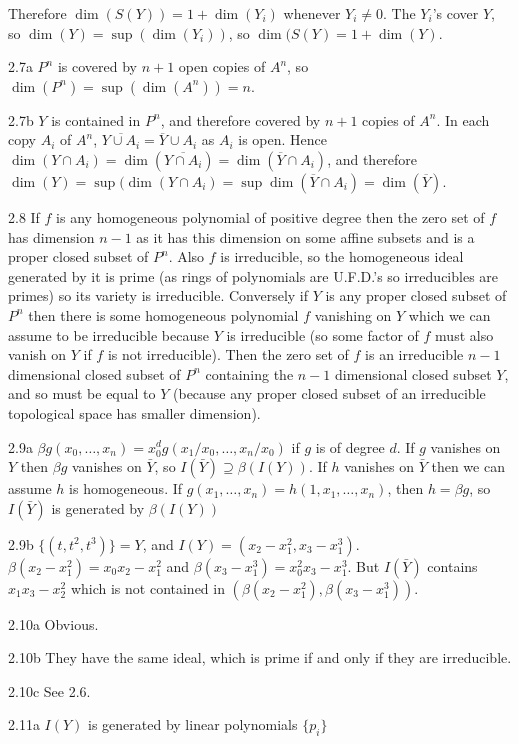 Therefore $\dim(S(Y))=1+\dim(Y_i)$ whenever $Y_i\ne 0$. 
The $Y_i$'s cover $Y$, so $\dim(Y)=\sup(\dim(Y_i))$, so 
$\dim(S(Y)=1+\dim(Y)$. 
\item {2.7a} $P^n$ is covered by $n+1$ open copies of $A^n$,
so $\dim(P^n)=\sup(\dim(A^n))=n$. 
\item{2.7b} $Y$ is contained in $P^n$, and therefore covered by $n+1$ copies
of $A^n$. In each copy $A_i$ of $A^n$, $\overline{Y\cup A_i}=
\overline{Y}\cup A_i$ as $A_i$ is open. Hence $\dim(Y\cap A_i)= \dim(
\overline{Y\cap A_i}) = \dim(\overline{Y}\cap A_i)$, and therefore
$\dim(Y)=\sup(\dim(Y\cap A_i)= \sup\dim(\overline{Y}\cap A_i)=
\dim(\overline{Y})$. 
\item {2.8} If $f$ is any homogeneous polynomial of positive degree then the zero set
of $f$ has dimension $n-1$ as it has this dimension on some affine subsets
and is a proper closed subset of $P^n$. Also $f$ is irreducible,
so the homogeneous ideal generated by it is prime (as rings of polynomials
are U.F.D.'s so irreducibles are primes) so its variety is irreducible. 
Conversely if $Y$ is any proper closed subset of
$P^n$ then there is some homogeneous polynomial $f$ vanishing on $Y$
which we can assume to be irreducible because $Y$ is irreducible
(so some factor of $f$ must also vanish on $Y$ if $f$ is not irreducible).
Then the zero set of $f$ is an irreducible $n-1$ dimensional 
closed subset of $P^n$ containing the $n-1$ dimensional closed
subset $Y$, and so must be equal to $Y$ (because any proper closed
subset of an irreducible topological space has smaller dimension). 
\item {2.9a} $\beta g(x_0,\ldots,x_n) = x_0^dg(x_1/x_0,\ldots,x_n/x_0)$
if $g$ is of degree $d$. If $g$ vanishes on $Y$ then $\beta g$ vanishes
on $\bar Y$, so $I(\bar Y)\supseteq \beta(I(Y))$. If $h$ vanishes on $\bar Y$
then we can assume $h$ is homogeneous. If $g(x_1,\ldots,x_n)=h(1,x_1,\ldots,x_n)$,
then $h=\beta g$, so $I(\bar Y)$ is generated by $\beta(I(Y))$
\item {2.9b} $\{(t,t^2,t^3)\}=Y$, and $I(Y)=(x_2-x_1^2, x_3-x_1^3)$. 
$\beta(x_2-x_1^2)=x_0x_2-x_1^2$ and $\beta(x_3-x_1^3)= x_0^2x_3-x_1^3$. 
But $I(\bar Y)$ contains $x_1x_3-x_2^2$ which is not contained in 
$(\beta(x_2-x_1^2),\beta(x_3-x_1^3))$.
\item{2.10a} Obvious. 
\item{2.10b} They have the same ideal, which is prime if and only 
if they are irreducible.
\item{2.10c} See 2.6. 
\item{2.11a} $I(Y)$ is generated by linear polynomials $\{p_i\}$
